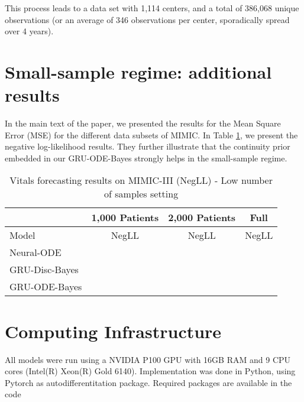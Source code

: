 \documentclass{article}
\newcommand{\method}{GRU-ODE-Bayes}
\begin{document}
This process leads to a data set with 1,114 centers, and a total of 386,068 unique observations (or an average of 346 observations per center, sporadically spread over 4 years).

\section{Small-sample regime: additional results}
\label{app:small-sample}
In the main text of the paper, we presented the results for the Mean Square Error (MSE) for the different data subsets of MIMIC. In Table \ref{table:mini-negll}, we present the negative log-likelihood results. They further illustrate that the continuity prior embedded in our \method{} strongly helps in the small-sample regime.

\begin{table}[h]
\caption{Vitals forecasting results on MIMIC-III (NegLL) - Low number of samples setting}
\label{table:mini-negll}
\vskip 0.15in
\begin{center}
\begin{small}
\begin{sc}
\begin{tabular}{lc|c|c}
\toprule
& \multicolumn{1}{c}{1,000 Patients} & \multicolumn{1}{c}{2,000 Patients} & \multicolumn{1}{c}{Full}  \\
\midrule
Model &  NegLL &  NegLL &  NegLL \\

\midrule

Neural-ODE       &   &   &  \\ 
\hline
GRU-Disc-Bayes  &   &   &  \\
\hline
GRU-ODE-Bayes     &   &   &  \\


\bottomrule
\end{tabular}
\end{sc}
\end{small}
\end{center}
\vskip -0.1in
\end{table}

\section{Computing Infrastructure}
\label{app:infrastructure}

All models were run using a NVIDIA P100 GPU with 16GB RAM and 9 CPU cores (Intel(R) Xeon(R) Gold 6140). Implementation was done in Python, using Pytorch as autodifferentitation package. Required packages are available in the code
\end{document}
